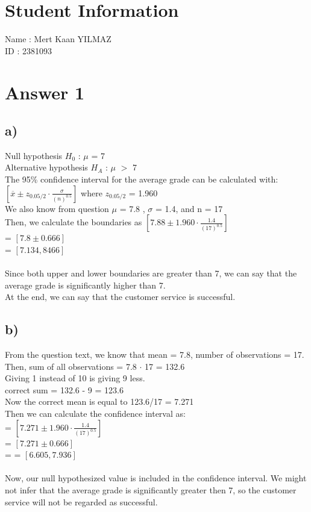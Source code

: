 \documentclass[12pt]{article}
\begin{document}
\section*{Student Information}

Name : Mert Kaan YILMAZ\\

ID : 2381093\\


\section*{Answer 1}

\subsection*{a)}
Null hypothesis $H_0$ : $\mu$ = 7\\
Alternative hypothesis $H_A$ : $\mu$ $>$  7\\
The 95\% confidence interval for the average grade can be calculated with:\\
$[ \overline{x} \pm z_{0.05/2}\cdot\frac{\sigma}{(n)^{0.5}}]$ where $z_{0.05/2}$ = 1.960\\
We also know from question $\mu$ = 7.8 , $\sigma$ = 1.4, and n = 17\\
Then, we calculate the boundaries as $[ 7.88 \pm 1.960\cdot\frac{1.4}{(17)^{0.5}}]$\\
= $[ 7.8 \pm 0.666]$\\
= $[ 7.134, 8466]$\\\\
Since both upper and lower boundaries are greater than 7, we can say that the average grade is significantly higher than 7.\\
At the end, we can say that the customer service is successful.

\subsection*{b)}
From the question text, we know that mean = 7.8, number of observations = 17.\\
Then, sum of all observations = 7.8 $\cdot$ 17 = 132.6\\
Giving 1 instead of 10 is giving 9 less.\\
correct sum = 132.6 - 9 = 123.6\\
Now the correct mean is equal to 123.6/17 = 7.271\\
Then we can calculate the confidence interval as:\\
= $[ 7.271 \pm 1.960\cdot\frac{1.4}{(17)^{0.5}}]$\\
= $[ 7.271 \pm 0.666]$\\
= = $[ 6.605, 7.936]$\\\\
Now, our null hypothesized value is included in the confidence interval. We might not infer that the average grade is significantly greater then 7, so the customer service will not be regarded as successful.\\
\end{document}
